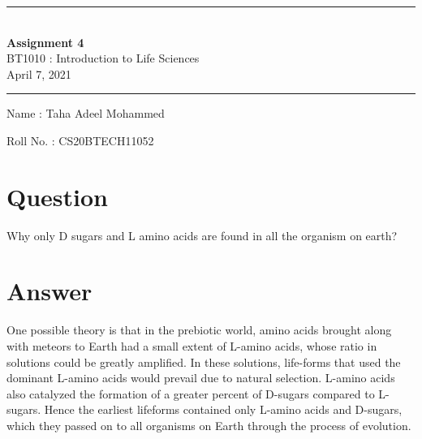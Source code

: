 \documentclass[12pt]{article}
\begin{document}
\begin{center}
\par\noindent\rule{\textwidth}{0.6pt}\\[0.3cm]
\textbf{\LARGE{Assignment 4}}\\[0.3cm]
\Large{BT1010 : Introduction to Life Sciences}\\[0.1cm]
\large{April 7, 2021}\\[0cm]
\par\noindent\rule{\textwidth}{0.6pt}
\end{center}
\noindent
\hspace{0.4cm}Name : Taha Adeel Mohammed
\par \noindent
\hspace{0.4cm}Roll No. : CS20BTECH11052
\section*{Question}
\noindent Why only D sugars and L amino acids are found in all the organism on earth?

\section*{Answer}
\noindent One possible theory is that in the prebiotic world, amino acids brought along with meteors to Earth had a small extent of L-amino acids, whose ratio in solutions could be greatly amplified. In these solutions, life-forms that used the dominant L-amino acids would prevail due to natural selection. L-amino acids also catalyzed the formation of a greater percent of D-sugars compared to L-sugars. Hence the earliest lifeforms contained only L-amino acids and D-sugars, which they passed on to all organisms on Earth through the process of evolution. 
\end{document}
